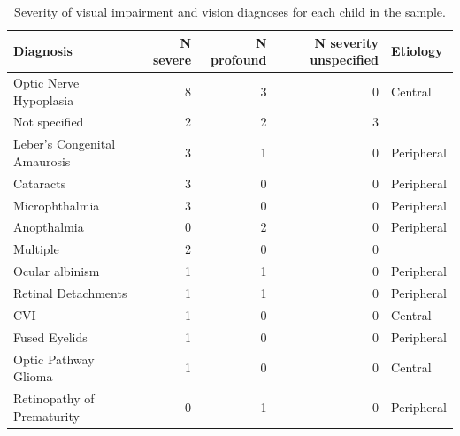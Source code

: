 \documentclass[
  man,floatsintext]{apa6}
\begin{document}
\begin{table}[H]

\caption{\label{tab:diagnosis-table}Severity of visual impairment and vision diagnoses for each child in the sample.}
\centering
\begin{tabular}[t]{l|r|r|r|l}
\hline
Diagnosis & N severe & N profound & N severity unspecified & Etiology\\
\hline
Optic Nerve Hypoplasia & 8 & 3 & 0 & Central\\
\hline
Not specified & 2 & 2 & 3 & \\
\hline
Leber's Congenital Amaurosis & 3 & 1 & 0 & Peripheral\\
\hline
Cataracts & 3 & 0 & 0 & Peripheral\\
\hline
Microphthalmia & 3 & 0 & 0 & Peripheral\\
\hline
Anopthalmia & 0 & 2 & 0 & Peripheral\\
\hline
Multiple & 2 & 0 & 0 & \\
\hline
Ocular albinism & 1 & 1 & 0 & Peripheral\\
\hline
Retinal Detachments & 1 & 1 & 0 & Peripheral\\
\hline
CVI & 1 & 0 & 0 & Central\\
\hline
Fused Eyelids & 1 & 0 & 0 & Peripheral\\
\hline
Optic Pathway Glioma & 1 & 0 & 0 & Central\\
\hline
Retinopathy of Prematurity & 0 & 1 & 0 & Peripheral\\
\hline
\end{tabular}
\end{table}
\end{document}
